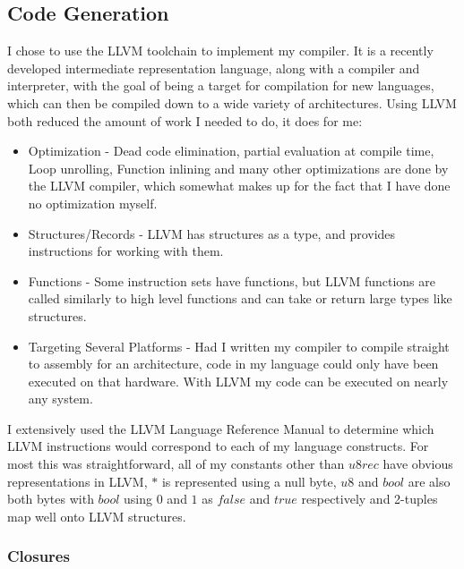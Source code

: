 \subsection{Code Generation}

I chose to use the LLVM toolchain to implement my compiler.
It is a recently developed intermediate representation language, along with a compiler and interpreter,
with the goal of being a target for compilation for new languages, which can then be compiled down to
a wide variety of architectures.
Using LLVM both reduced the amount of work I needed to do, it does for me:
\begin{itemize}
    \item Optimization -
    Dead code elimination,
    partial evaluation at compile time,
    Loop unrolling,
    Function inlining
    and many other optimizations are done by the LLVM compiler, which somewhat makes up for the fact that
    I have done no optimization myself.
    \item Structures/Records -
    LLVM has structures as a type, and provides instructions for working with them.
    \item Functions -
    Some instruction sets have functions, but LLVM functions are called similarly to high level functions
    and can take or return large types like structures.
    \item Targeting Several Platforms -
    Had I written my compiler to compile straight to assembly for an architecture, code in my language could
    only have been executed on that hardware.
    With LLVM my code can be executed on nearly any system.
\end{itemize}
I extensively used the LLVM Language Reference Manual \cite{llvm} to determine which LLVM instructions
would correspond to each of my language constructs.
For most this was straightforward, all of my constants other than $u8rec$ have obvious representations
in LLVM, $\ast$ is represented using a null byte, $u8$ and $bool$ are also both bytes with $bool$ using
$0$ and $1$ as $false$ and $true$ respectively and 2-tuples map well onto LLVM structures.

\subsubsection{Closures}

